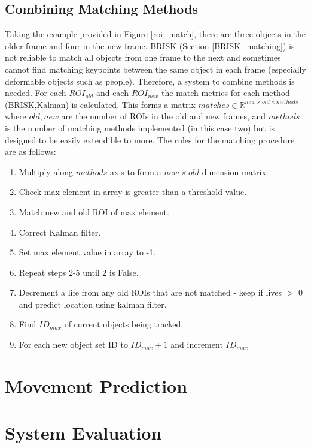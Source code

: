 \documentclass[a4paper,11pt,notitlepage]{article}
\begin{document}
\subsection{Combining Matching Methods} \label{matching_combining_methods}

Taking the example provided in Figure \ref{roi_match}, there are three objects in the older frame and four in the new frame. BRISK (Section \ref{BRISK_matching}) is not reliable to match all objects from one frame to the next and sometimes cannot find matching keypoints between the same object in each frame (especially deformable objects such as people). Therefore, a system to combine methods is needed. For each $ROI_{old}$ and each $ROI_{new}$ the match metrics for each method (BRISK,Kalman) is calculated. This forms a matrix $matches \in \mathbb{R}^{new \times old \times methods}$ where $old,new$ are the number of ROIs in the old and new frames, and 
$methods$ is the number of matching methods implemented (in this case two) but is designed to be easily extendible to more. The rules for the matching procedure are as follows:

\begin{enumerate}
	\item Multiply along $methods$ axis to form a $new \times old$ dimension matrix.
	\item Check max element in array is greater than a threshold value.
	\item Match new and old ROI of max element.
	\item Correct Kalman filter.
	\item Set max element value in array to -1.
	\item Repeat steps 2-5 until 2 is False.
	\item Decrement a life from any old ROIs that are not matched - keep if lives $>$ 0 and predict location using kalman filter.
	\item Find $ID_{max}$ of current objects being tracked.
	\item For each new object set ID to $ID_{max}+1$ and increment $ID_{max}$
\end{enumerate}

\section{Movement Prediction}



\section{System Evaluation}
\end{document}
